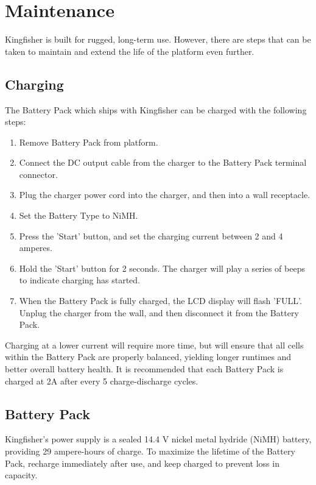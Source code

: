 \documentclass[]{clearpath-latex/clearpath-manual}
\begin{document}
\newpage

\section{Maintenance}
Kingfisher is built for rugged, long-term use. However, there are steps that can be taken to maintain and extend the life of the platform even further.

\subsection{Charging}
The Battery Pack which ships with Kingfisher can be charged with the following steps:

\begin{enumerate}[nolistsep]
	\item Remove Battery Pack from platform.
	\item Connect the DC output cable from the charger to the Battery Pack terminal connector.
	\item Plug the charger power cord into the charger, and then into a wall receptacle.
	\item Set the Battery Type to NiMH.
	\item Press the 'Start' button, and set the charging current between 2 and 4 amperes.
	\item Hold the 'Start' button for 2 seconds. The charger will play a series of beeps to indicate charging has started.
	\item When the Battery Pack is fully charged, the LCD display will flash 'FULL'. Unplug the charger from the wall, and then disconnect it from the Battery Pack.
\end{enumerate}

Charging at a lower current will require more time, but will ensure that all cells within the Battery Pack are properly balanced, yielding longer runtimes and better overall battery health. It is recommended that each Battery Pack is charged at 2A after every 5 charge-discharge cycles.

\subsection{Battery Pack}
Kingfisher’s power supply is a sealed 14.4 V nickel metal hydride (NiMH) battery, providing 29 ampere-hours of charge. To maximize the lifetime of the Battery Pack, recharge immediately after use, and keep charged to prevent loss in capacity.
\end{document}
